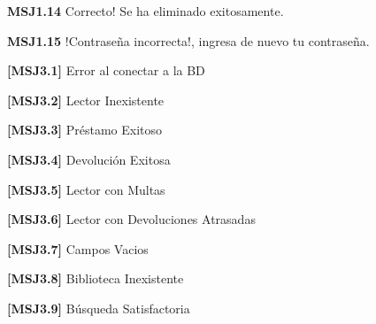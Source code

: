	\begin{Citemize}
	\item {\bf MSJ1.14} Correcto! Se ha eliminado exitosamente.
	\end{Citemize}
	
	\begin{Citemize}
	\item {\bf MSJ1.15} !Contraseña incorrecta!, ingresa de nuevo tu contraseña.
	\end{Citemize}

	\begin{Citemize}
	\item {\bf [MSJ3.1]} Error al conectar a la BD
	\end{Citemize}

	\begin{Citemize}
	\item {\bf [MSJ3.2]} Lector Inexistente
	\end{Citemize}
	
	\begin{Citemize}
	\item {\bf [MSJ3.3]} Préstamo Exitoso
	\end{Citemize}
	
	\begin{Citemize}
	\item {\bf [MSJ3.4]} Devolución Exitosa
	\end{Citemize}
	
	\begin{Citemize}
	\item {\bf [MSJ3.5]} Lector con Multas
	\end{Citemize}
	
	\begin{Citemize}
	\item {\bf [MSJ3.6]} Lector con Devoluciones Atrasadas
	\end{Citemize}
	
	\begin{Citemize}
	\item {\bf [MSJ3.7]} Campos Vacios
	\end{Citemize}
	
	\begin{Citemize}
	\item {\bf [MSJ3.8]} Biblioteca Inexistente
	\end{Citemize}
	
	\begin{Citemize}
	\item {\bf [MSJ3.9]} Búsqueda Satisfactoria
	\end{Citemize}
	
